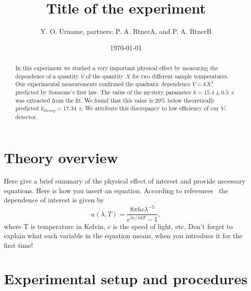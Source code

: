\documentclass[letterpaper,12pt]{article}
\begin{document}
\title{Title of the experiment}
\author{Y. O. Urname, partners:  P. A. RtnerA, and P. A. RtnerB}
\date{\today}
\maketitle

\begin{abstract}
In this experiment we studied a very important physical effect by measuring the
dependence of a quantity $V$ of the quantity $X$ for two different sample
temperatures.  Our experimental measurements confirmed the quadratic dependence
$V = kX^2$ predicted by Someone's first law. The value of the mystery parameter
$k = 15.4\pm 0.5$~s was extracted from the fit. We found that this value is
20\% below theoretically predicted $k_{theory}=17.34$~s. We attribute this
discrepancy to low efficiency of our $V$-detector.
\end{abstract}




\section{Theory overview}
Here give a brief summary of the physical effect of interest and provide
necessary equations. Here is how you insert an equation. According to
references~\cite{melissinos, Cyr, Wiki} the dependence of interest is given
by
\begin{equation} \label{eq:aperp}
u(\lambda,T)=\frac{8\pi hc\lambda^{-5}}{e^{hc/\lambda kT}-1},
\end{equation}
where T is temperature in Kelvin, c is the speed of light, etc. Don't forget to
explain what each variable in the equation means, when you introduce it for the
first time!




\section{Experimental setup and procedures}
\end{document}
